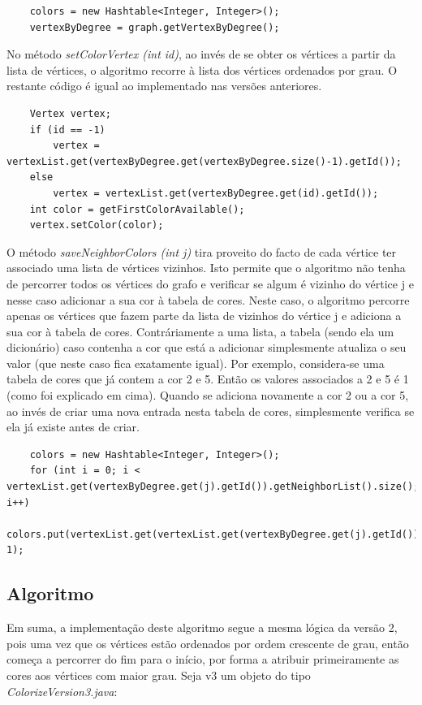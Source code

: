\documentclass[a4paper,12pt]{report}
\begin{document}
\begin{lstlisting}
    colors = new Hashtable<Integer, Integer>();
    vertexByDegree = graph.getVertexByDegree();
\end{lstlisting}

No método \textit{setColorVertex (int id)}, ao invés de se obter os vértices a partir da lista de vértices, o algoritmo recorre à lista dos vértices ordenados por grau. O restante código é igual ao implementado nas versões anteriores.

\begin{lstlisting}
    Vertex vertex;
    if (id == -1)   
        vertex = vertexList.get(vertexByDegree.get(vertexByDegree.size()-1).getId());
    else
        vertex = vertexList.get(vertexByDegree.get(id).getId());
    int color = getFirstColorAvailable();
    vertex.setColor(color);
\end{lstlisting}

O método \textit{saveNeighborColors (int j)} tira proveito do facto de cada vértice ter associado uma lista de vértices vizinhos. Isto permite que o algoritmo não tenha de percorrer todos os vértices do grafo e verificar se algum é vizinho do vértice j e nesse caso adicionar a sua cor à tabela de cores. Neste caso, o algoritmo percorre apenas os vértices que fazem parte da lista de vizinhos do vértice j e adiciona a sua cor à tabela de cores.
Contráriamente a uma lista, a tabela (sendo ela um dicionário) caso contenha a cor que está a adicionar simplesmente atualiza o seu valor (que neste caso fica exatamente igual). Por exemplo, considera-se uma tabela de cores que já contem a cor 2 e 5. Então os valores associados a 2 e 5 é 1 (como foi explicado em cima). Quando se adiciona novamente a cor 2 ou a cor 5, ao invés de criar uma nova entrada nesta tabela de cores, simplesmente verifica se ela já existe antes de criar.

\begin{lstlisting}
    colors = new Hashtable<Integer, Integer>();   
    for (int i = 0; i < vertexList.get(vertexByDegree.get(j).getId()).getNeighborList().size(); i++)
        colors.put(vertexList.get(vertexList.get(vertexByDegree.get(j).getId()).getNeighborList().get(i)).getColor(), 1);
\end{lstlisting}

\subsection{Algoritmo}

Em suma, a implementação deste algoritmo segue a mesma lógica da versão 2, pois uma vez que os vértices estão ordenados por ordem crescente de grau, então começa a percorrer do fim para o início, por forma a atribuir primeiramente as cores aos vértices com maior grau.
Seja v3 um objeto do tipo \textit{ColorizeVersion3.java}:
\end{document}

